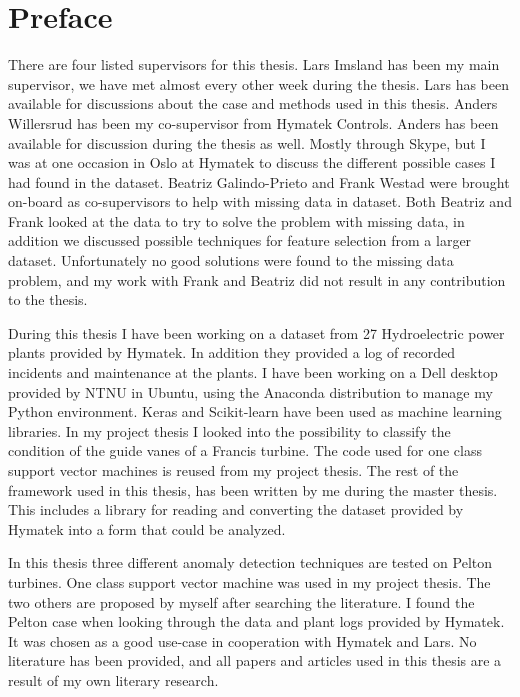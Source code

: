 \chapter*{Preface}

    
    There are four listed supervisors for this thesis. Lars Imsland has been my main supervisor, we have met almost every other week during the thesis. Lars has been available for discussions about the case and methods used in this thesis. Anders Willersrud has been my co-supervisor from Hymatek Controls. Anders has been available for discussion during the thesis as well. Mostly through Skype, but I was at one occasion in Oslo at Hymatek to discuss the different possible cases I had found in the dataset. Beatriz Galindo-Prieto and Frank Westad were brought on-board as co-supervisors to help with missing data in dataset. Both Beatriz and Frank looked at the data to try to solve the problem with missing data, in addition we discussed possible techniques for feature selection from a larger dataset. Unfortunately no good solutions were found to the missing data problem, and my work with Frank and Beatriz did not result in any contribution to the thesis.
    
    During this thesis I have been working on a dataset from 27 Hydroelectric power plants provided by Hymatek. In addition they provided a log of recorded incidents and maintenance at the plants. I have been working on a Dell desktop provided by NTNU in Ubuntu, using the Anaconda distribution to manage my Python environment. Keras and Scikit-learn have been used as machine learning libraries. In my project thesis I looked into the possibility to classify the condition of the guide vanes of a Francis turbine. The code used for one class support vector machines is reused from my project thesis. The rest of the framework used in this thesis, has been written by me during the master thesis. This includes a library for reading and converting the dataset provided by Hymatek into a form that could be analyzed. 
    
    In this thesis three different anomaly detection techniques are tested on Pelton turbines. One class support vector machine was used in my project thesis. The two others are proposed by myself after searching the literature. I found the Pelton case when looking through the data and plant logs provided by Hymatek. It was chosen as a good use-case in cooperation with Hymatek and Lars. No literature has been provided, and all papers and articles used in this thesis are a result of my own literary research.

